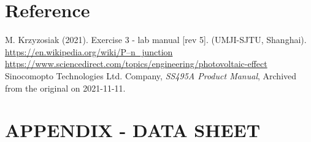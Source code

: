 \documentclass[a4paper]{article}
\begin{document}
\newpage
\section{Reference}
\noindent [1] M. Krzyzosiak (2021). Exercise 3 - lab manual [rev 5]. (UMJI-SJTU, Shanghai). \\
\noindent [2] \url{https://en.wikipedia.org/wiki/P–n_junction} \\
\noindent [3] \url{https://www.sciencedirect.com/topics/engineering/photovoltaic-effect} \\
\noindent [4] Sinocomopto Technologies Ltd. Company, \textit{SS495A Product Manual}, Archived from the original on 2021-11-11.


\newpage
\section*{APPENDIX - DATA SHEET}

%
%
%
\end{document}
